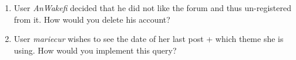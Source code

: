 \begin{enumerate}
      \item User \textit{AnWakefi} decided that he did not like the forum and thus un-registered from it. How would you delete his account?
        \if{}\fi
      
      \item User \textit{mariecur} wishes to see the date of her last post + which theme she is using. How would you implement this query?
        \if{}\fi
    \end{enumerate}
